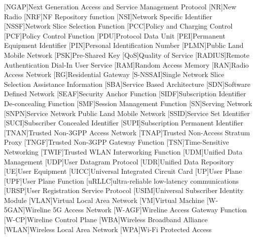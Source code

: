 \begin{multicols}{2}
\begin{acronym}[AAAAAA]
        [NGAP]{Next Generation Access and Service Management Protocol}
        [NR]{New Radio}
        [NRF]{NF Repository function}
        [NSI]{Network Specific Identifier}
        [NSSF]{Network Slice Selection Function}
        [PCC]{Policy and Charging Control}
        [PCF]{Policy Control Function}
        [PDU]{Protocol Data Unit}
        [PEI]{Permanent Equipment Identifier}
        [PIN]{Personal Identification Number}
        [PLMN]{Public Land Mobile Network}
        [PSK]{Pre-Shared Key}
        [QoS]{Quality of Service}
        [RADIUS]{Remote Authentication Dial-In User Service}
        [RAM]{Random Access Memory}
        [RAN]{Radio Access Network}
        [RG]{Residential Gateway}
        [S-NSSAI]{Single Network Slice Selection Assistance Information}
        [SBA]{Service Based Architecture}
        [SDN]{Software Defined Network}
        [SEAF]{Security Anchor Function}
        [SIDF]{Subscription Identifier De-concealing Function}
        [SMF]{Session Management Function}
        [SN]{Serving Network}
        [SNPN]{Service Network Public Land Mobile Network}
        [SSID]{Service Set Identifier}
        [SUCI]{Subscriber Concealed Identifier}
        [SUPI]{Subscription Permanent Identifier}
        [TNAN]{Trusted Non-3GPP Access Network}
        [TNAP]{Trusted Non-Access Stratum Proxy}
        [TNGF]{Trusted Non-3GPP Gateway Function}
        [TSN]{Time-Sensitive Networking}
        [TWIF]{Trusted WLAN Interworking Function}
        [UDM]{Unified Data Management}
        [UDP]{User Datagram Protocol}
        [UDR]{Unified Data Repository}
        [UE]{User Equipment}
        [UICC]{Universal Integrated Circuit Card}
        [UP]{User Plane}
        [UPF]{User Plane Function}
        [uRLLC]{ultra-reliable low-latency communications}
        [URSP]{User Registration Service Protocol}
        [USIM]{Universal Subscriber Identity Module}
        [VLAN]{Virtual Local Area Network}
        [VM]{Virtual Machine}
        [W-5GAN]{Wireline 5G Access Network}
        [W-AGF]{Wireline Access Gateway Function}
        [W-CP]{Wireline Control Plane}
        [WBA]{Wireless Broadband Alliance}
        [WLAN]{Wireless Local Area Network}
        [WPA]{Wi-Fi Protected Access}
    \end{acronym}
\end{multicols}